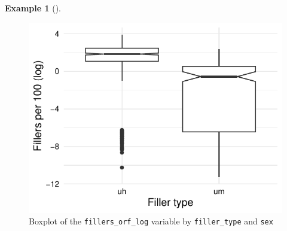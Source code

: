 \documentclass[
  letterpaper,
  krantz1]{latex/krantz-mod}
\theoremstyle{definition}
\newtheorem{example}{Example}[chapter]
\theoremstyle{definition}
\theoremstyle{remark}
\begin{document}
\begin{example}[]
\begin{figure}[!htb]
\begin{minipage}{0.50\linewidth}
{\includegraphics{part_4/10_infer_files/figure-pdf/fig-infer-multi-sex-plot-1.pdf}

}


\end{minipage}%
%
\begin{minipage}{0.50\linewidth}



\end{minipage}%

\caption{\label{fig-infer-multi-sex-plot}Boxplot of the
\texttt{fillers\_orf\_log} variable by \texttt{filler\_type} and
\texttt{sex}}

\end{figure}%

\end{example}
\end{document}
